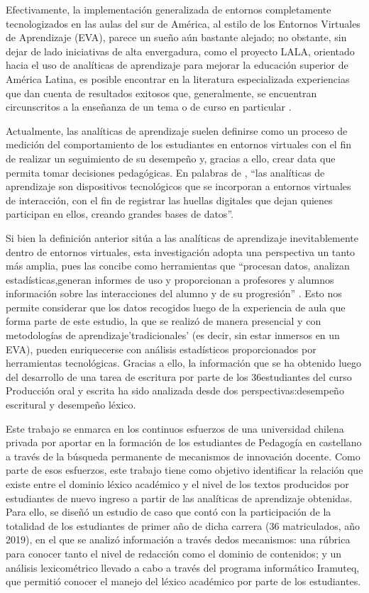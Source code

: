 \documentclass{textolivre-html}
\begin{document}
Efectivamente, la implementación generalizada de entornos
completamente tecnologizados en las aulas del sur de América, al estilo de los
Entornos Virtuales de Aprendizaje (EVA), parece un sueño aún bastante alejado;
no obstante, sin dejar de lado iniciativas de alta envergadura, como el proyecto
LALA, orientado hacia el uso de analíticas de aprendizaje para mejorar la
educación superior de América Latina, es posible encontrar en la literatura
especializada experiencias que dan cuenta de resultados exitosos que,
generalmente, se encuentran circunscritos a la enseñanza de un tema o de curso
en particular \cite[por ejemplo]{ninoCarrasco2019}.

Actualmente, las analíticas de aprendizaje suelen definirse como un proceso
de medición del comportamiento de los estudiantes en entornos virtuales con el
fin de realizar un seguimiento de su desempeño y, gracias a ello, crear data que
permita tomar decisiones pedagógicas. En palabras de \textcite{Sabulsky2019},
“las analíticas de aprendizaje son dispositivos tecnológicos que se incorporan a
entornos virtuales de interacción, con el fin de registrar las huellas digitales
que dejan quienes participan en ellos, creando grandes bases de datos”.

Si bien la definición anterior sitúa a las analíticas de aprendizaje
inevitablemente
dentro de entornos virtuales, esta investigación adopta una
perspectiva un tanto más amplia, pues las concibe como herramientas que
“procesan datos, analizan estadísticas,generan informes de uso y
proporcionan a profesores y alumnos información sobre
las interacciones del alumno y de su progresión” \cite[p. 185]{conole}. Esto
nos permite considerar que los datos recogidos luego de la experiencia de aula
que forma parte de este estudio, la que se realizó de manera presencial y con
metodologías de aprendizaje'tradicionales' (es decir, sin estar inmersos en un
EVA), pueden enriquecerse con análisis estadísticos proporcionados por
herramientas tecnológicas. Gracias a ello, la información que se ha
obtenido luego del desarrollo de una tarea de escritura por
parte de los 36estudiantes del curso Producción oral y escrita ha sido
analizada desde dos perspectivas:desempeño escritural y desempeño léxico.

Este trabajo se enmarca en los continuos esfuerzos de una universidad
chilena privada por aportar en la formación de los estudiantes de Pedagogía en
castellano a través de la búsqueda permanente de mecanismos de innovación
docente. Como parte de esos esfuerzos, este trabajo tiene como objetivo
identificar la relación que existe entre el dominio léxico académico y el nivel
de los textos producidos por estudiantes de nuevo ingreso a partir de las
analíticas de aprendizaje obtenidas. Para ello, se diseñó un estudio de caso que
contó con la participación de la totalidad de los estudiantes de primer año
de dicha carrera (36 matriculados, año 2019), en el que se analizó información a
través dedos mecanismos: una rúbrica para conocer tanto el nivel de redacción
como el dominio de contenidos; y un análisis lexicométrico llevado a cabo a
través del programa informático Iramuteq, que permitió conocer el manejo del
léxico académico por parte de los estudiantes.
\end{document}
